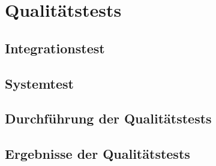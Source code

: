 \chapter{Qualitätstests}

\section{Integrationstest}

\section{Systemtest}

\section{Durchführung der Qualitätstests}

\section{Ergebnisse der Qualitätstests}